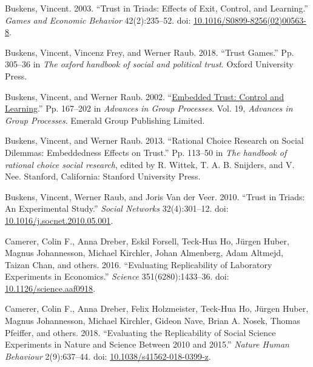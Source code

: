 \documentclass[
  11pt,
]{article}
\newlength{\cslhangindent}
\newlength{\cslentryspacingunit} %
\newenvironment{CSLReferences}[2] %
 {%
  \setlength{\parindent}{0pt}
  \ifodd #1
  \let\oldpar\par
  \def\par{\hangindent=\cslhangindent\oldpar}
  \fi
  \setlength{\parskip}{#2\cslentryspacingunit}
 }%
 {}
\begin{document}
\begin{CSLReferences}{1}{0}
\leavevmode{}%
Buskens, Vincent. 2003. {``Trust in Triads: Effects of Exit, Control, and Learning.''} \emph{Games and Economic Behavior} 42(2):235--52. doi: \href{https://doi.org/10.1016/S0899-8256(02)00563-8}{10.1016/S0899-8256(02)00563-8}.

\leavevmode{}%
Buskens, Vincent, Vincenz Frey, and Werner Raub. 2018. {``Trust Games.''} Pp. 305--36 in \emph{The oxford handbook of social and political trust}. Oxford University Press.

\leavevmode{}%
Buskens, Vincent, and Werner Raub. 2002. {``\href{https://doi.org/10.1016/S0882-6145(02)19007-2}{Embedded Trust: {Control} and Learning}.''} Pp. 167--202 in \emph{Advances in {Group} {Processes}}. Vol. 19, \emph{Advances in {Group} {Processes}}. Emerald Group Publishing Limited.

\leavevmode{}%
Buskens, Vincent, and Werner Raub. 2013. {``Rational Choice Research on Social Dilemmas: Embeddedness Effects on Trust.''} Pp. 113--50 in \emph{The handbook of rational choice social research}, edited by R. Wittek, T. A. B. Snijders, and V. Nee. Stanford, California: Stanford University Press.

\leavevmode{}%
Buskens, Vincent, Werner Raub, and Joris Van der Veer. 2010. {``Trust in Triads: An Experimental Study.''} \emph{Social Networks} 32(4):301--12. doi: \href{https://doi.org/10.1016/j.socnet.2010.05.001}{10.1016/j.socnet.2010.05.001}.

\leavevmode{}%
Camerer, Colin F., Anna Dreber, Eskil Forsell, Teck-Hua Ho, Jürgen Huber, Magnus Johannesson, Michael Kirchler, Johan Almenberg, Adam Altmejd, Taizan Chan, and others. 2016. {``Evaluating Replicability of Laboratory Experiments in Economics.''} \emph{Science} 351(6280):1433--36. doi: \href{https://doi.org/10.1126/science.aaf0918}{10.1126/science.aaf0918}.

\leavevmode{}%
Camerer, Colin F., Anna Dreber, Felix Holzmeister, Teck-Hua Ho, Jürgen Huber, Magnus Johannesson, Michael Kirchler, Gideon Nave, Brian A. Nosek, Thomas Pfeiffer, and others. 2018. {``Evaluating the Replicability of Social Science Experiments in Nature and Science Between 2010 and 2015.''} \emph{Nature Human Behaviour} 2(9):637--44. doi: \href{https://doi.org/10.1038/s41562-018-0399-z}{10.1038/s41562-018-0399-z}.


\end{CSLReferences}
\end{document}
